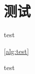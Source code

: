 \documentclass{../gdutthesis}
\begin{document}
\mainmatter

\chapter{测试}{test}

\autoref{alg:test}

\begin{algorithm}
  \caption{test}\label{alg:test}
\end{algorithm}
\end{document}
